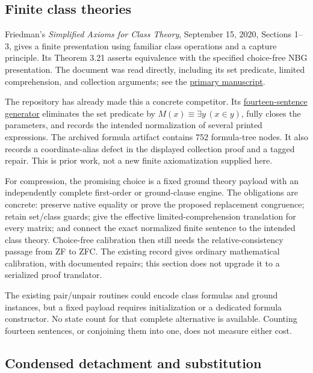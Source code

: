 \subsection{Finite class theories}

Friedman's \emph{Simplified Axioms for Class Theory}, September 15, 2020,
Sections 1--3, gives a finite presentation using familiar class operations
and a capture principle.  Its Theorem 3.21 asserts equivalence with the
specified choice-free NBG presentation.  The document was read directly,
including its set predicate, limited comprehension, and collection
arguments; see the
\href{https://bpb-us-w2.wpmucdn.com/u.osu.edu/dist/1/1952/files/2020/09/NBGAxioms091520.pdf}
{primary manuscript}.

The repository has already made this a concrete competitor.  Its
\href{https://github.com/VladimirReshetnikov/ProveIt/blob/8c41b1fb7d7bb8cd0612e37848181fe4a2f5d569/SetTheory/Cardinals/docs/reports/set-theory/zfc-closure-kernels/code/41-cyclic-code-finite_nbg.py}
{fourteen-sentence generator} eliminates the set predicate by
$M(x)\equiv\exists y\,(x\in y)$, fully closes the parameters, and records
the intended normalization of several printed expressions.  The archived
formula artifact contains 752 formula-tree nodes.  It also records a
coordinate-alias defect in the displayed collection proof and a tagged
repair.  This is prior work, not a new finite axiomatization supplied here.

For compression, the promising choice is a fixed ground theory payload
with an independently complete first-order or ground-clause engine.  The
obligations are concrete: preserve native equality or prove the proposed
replacement congruence; retain set/class guards; give the effective
limited-comprehension translation for every matrix; and connect the exact
normalized finite sentence to the intended class theory.  Choice-free
calibration then still needs the relative-consistency passage from ZF to
ZFC.  The existing record gives ordinary mathematical calibration, with
documented repairs; this section does not upgrade it to a serialized proof
translator.

The existing pair/unpair routines could encode class formulas and ground
instances, but a fixed payload requires initialization or a dedicated
formula constructor.  No state count for that complete alternative is
available.  Counting fourteen sentences, or conjoining them into one,
does not measure either cost.

\subsection{Condensed detachment and substitution}

